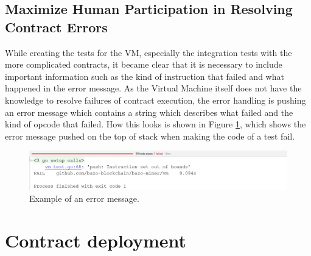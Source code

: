 \subsection{Maximize Human Participation in Resolving Contract Errors}
While creating the tests for the VM, especially the integration tests with the more complicated contracts, it became clear that it is necessary to include important information such as the kind of instruction that failed and what happened in the error message. As the Virtual Machine itself does not have the knowledge to resolve failures of contract execution, the error handling is pushing an error message which contains a string which describes what failed and the kind of opcode that failed. How this looks is shown in Figure \ref{pushtestfailure}, which shows the error message pushed on the top of stack when making the code of a test fail.

\begin{figure}[H]
	\begin{center}
	\includegraphics[width=\textwidth]{./images/push-test-failure}
	\caption{Example of an error message.}
	\label{pushtestfailure}
	\end{center}
\end{figure}

\section{Contract deployment}

